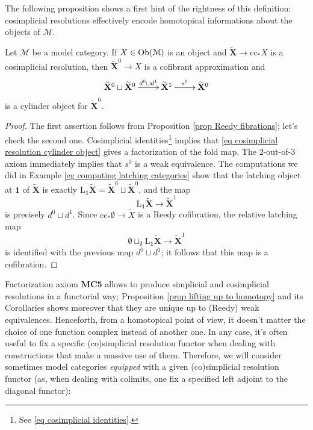 \begin{refsection}
The following proposition shows a first hint of the rightness of this definition: cosimplicial resolutions effectively encode homotopical informations about the objects of $\mathcal M$.

\begin{prop} \label{prop cosimplicial resolution cylinder object}
Let $\mathcal M$ be a model category. If $X \in \operatorname{Ob}(\mathcal M)$ is an object and $\widetilde{\mathbf X} \to \mathrm{cc}_* X$ is a cosimplicial resolution, then $\widetilde{\mathbf X}^0 \to X$ is a cofibrant approximation and
\begin{equation} \label{eq cosimplicial resolution cylinder object}
\xymatrix{
\widetilde{\mathbf X}^0 \sqcup \widetilde{\mathbf X}^0 \ar[r]^-{d^0 \sqcup d^1} & \widetilde{\mathbf X}^1 \ar[r]^{s^0} & \widetilde{\mathbf X}^0
}
\end{equation}
is a cylinder object for $\widetilde{\mathbf X}^0$.
\end{prop}

\begin{proof}
The first assertion follows from Proposition \ref{prop Reedy fibrations}; let's check the second one. Cosimplicial identities\footnote{See \eqref{eq cosimplicial identities}.} implies that \eqref{eq cosimplicial resolution cylinder object} gives a factorization of the fold map. The 2-out-of-3 axiom immediately implies that $s^0$ is a weak equivalence. The computations we did in Example \ref{eg computing latching categories} show that the latching object at $\mathbf 1$ of $\widetilde{\mathbf X}$ is exactly $\mathrm L_{\mathbf 1} \widetilde{\mathbf X} = \widetilde{\mathbf X}^0 \sqcup \widetilde{\mathbf X}^0$, and the map
\[
\mathrm L_{\mathbf 1} \widetilde{\mathbf X} \to \widetilde{\mathbf X}^1
\]
is precisely $d^0 \sqcup d^1$. Since $\mathrm{cc}_* \emptyset \to \widetilde{X}$ is a Reedy cofibration, the relative latching map
\[
\emptyset \sqcup_{\emptyset} \mathrm L_{\mathbf 1} \widetilde{\mathbf X} \to \widetilde{\mathbf X}^1
\]
is identified with the previous map $d^0 \sqcup d^1$; it follows that this map is a cofibration.
\end{proof}

Factorization axiom {\bfseries MC5} allows to produce simplicial and cosimplicial resolutions in a functorial way; Proposition \ref{prop lifting up to homotopy} and its Corollaries shows moreover that they are unique up to (Reedy) weak equivalences. Henceforth, from a homotopical point of view, it doesn't matter the choice of one function complex instead of another one. In any case, it's often useful to fix a specific (co)simplicial resolution functor when dealing with constructions that make a massive use of them. Therefore, we will consider sometimes model categories \emph{equipped} with a given (co)simplicial resolution functor (as, when dealing with colimits, one fix a specified left adjoint to the diagonal functor): %


\end{refsection}
